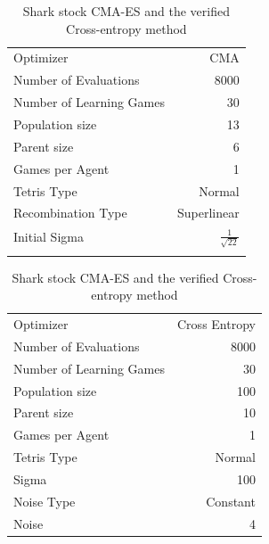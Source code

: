 \begin{table}[h]
\centering
\small
\caption{Shark stock CMA-ES and the verified Cross-entropy method}
\begin{tabular}{l r}
Optimizer & CMA\\
Number of Evaluations & 8000\\
Number of Learning Games & 30\\
Population size& 13\\
Parent size & 6\\
Games per Agent & 1\\
Tetris Type & Normal\\
\hline
Recombination Type & Superlinear\\
Initial Sigma & $\frac{1}{\sqrt{22}}$\\
\quad & \quad
\end{tabular}
\quad
\begin{tabular}{l r}
Optimizer & Cross Entropy\\
Number of Evaluations & 8000\\
Number of Learning Games & 30\\
Population size & 100\\
Parent size & 10\\
Games per Agent & 1\\
Tetris Type & Normal\\
\hline
Sigma & 100\\
Noise Type & Constant\\
Noise & 4
\end{tabular}
\end{table}

